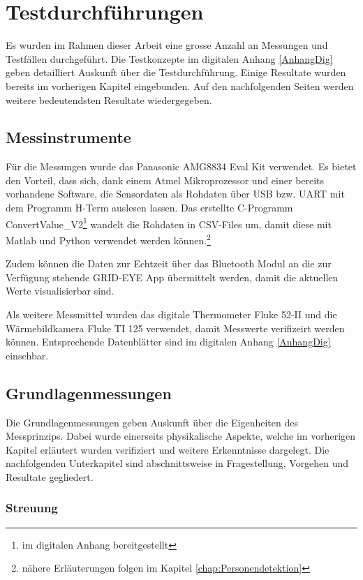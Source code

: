 \chapter{Testdurchführungen}
\label{chap:Testphasen}

Es wurden im Rahmen dieser Arbeit eine grosse Anzahl an Messungen und Testfällen durchgeführt. Die Testkonzepte im digitalen Anhang \ref{AnhangDig} geben detailliert Auskunft über die Testdurchführung. Einige Resultate wurden bereits im vorherigen Kapitel eingebunden. Auf den nachfolgenden Seiten werden weitere bedeutendsten Resultate wiedergegeben. 

\section{Messinstrumente}

Für die Messungen wurde das Panasonic AMG8834 Eval Kit verwendet. Es bietet den Vorteil, dass sich, dank einem Atmel Mikroprozessor und einer bereits vorhandene Software, die Sensordaten als Rohdaten über USB bzw. \ac{UART} mit dem Programm H-Term auslesen lassen. 
Das erstellte C-Programm ConvertValue\_V2\footnote[12]{im digitalen Anhang bereitgestellt} wandelt die Rohdaten in \ac{CSV}-Files um, damit diese mit Matlab und Python verwendet werden können.\footnote[13]{nähere Erläuterungen folgen im Kapitel \ref{chap:Personendetektion}}

Zudem können die Daten zur Echtzeit über das Bluetooth Modul an die zur Verfügung stehende GRID-EYE App übermittelt werden, damit die aktuellen Werte visualisierbar sind.

Als weitere Messmittel wurden das digitale Thermometer Fluke 52-II und die Wärmebildkamera Fluke TI 125 verwendet, damit Messwerte verifizeirt werden können. Entsprechende Datenblätter sind im digitalen Anhang \ref{AnhangDig} einsehbar.

\section{Grundlagenmessungen}

Die Grundlagenmessungen geben Auskunft über die Eigenheiten des Messprinzips. Dabei wurde einerseits physikalische Aspekte, welche im vorherigen Kapitel erläutert wurden verifiziert und weitere Erkenntnisse dargelegt. Die nachfolgenden Unterkapitel sind abschnittsweise in Fragestellung, Vorgehen und Resultate gegliedert.

\subsection{Streuung}

